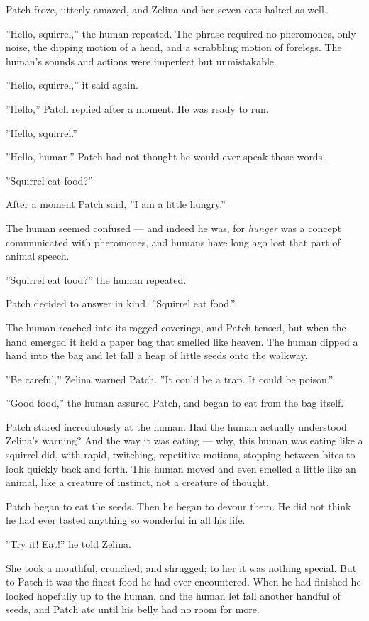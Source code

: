 \documentclass[12pt]{book}
\begin{document}
Patch froze, utterly amazed, and Zelina and her seven cats halted as well.

''Hello, squirrel,'' the human repeated. The phrase required no pheromones, only noise, the dipping motion of a head, and a scrabbling motion of forelegs. The human's sounds and actions were imperfect but unmistakable.

''Hello, squirrel,'' it said again.

''Hello,'' Patch replied after a moment. He was ready to run.

''Hello, squirrel.''

''Hello, human.'' Patch had not thought he would ever speak those words.

''Squirrel eat food?''

After a moment Patch said, ''I am a little hungry.''

The human seemed confused ---
and indeed he was, for {\it hunger} was a concept communicated with pheromones, and humans have long ago lost that part of animal speech.

''Squirrel eat food?'' the human repeated.

Patch decided to answer in kind. ''Squirrel eat food.''

The human reached into its ragged coverings, and Patch tensed, but when the hand emerged it held a paper bag that smelled like heaven. The human dipped a hand into the bag and let fall a heap of little seeds onto the walkway.

''Be careful,'' Zelina warned Patch. ''It could be a trap. It could be poison.''

''Good food,'' the human assured Patch, and began to eat from the bag itself.

Patch stared incredulously at the human. Had the human actually understood Zelina's warning? And the way it was eating ---
why, this human was eating like a squirrel did, with rapid, twitching, repetitive motions, stopping between bites to look quickly back and forth. This human moved and even smelled a little like an animal, like a creature of instinct, not a creature of thought.

Patch began to eat the seeds. Then he began to devour them. He did not think he had ever tasted anything so wonderful in all his life.

''Try it! Eat!'' he told Zelina.

She took a mouthful, crunched, and shrugged; to her it was nothing special. But to Patch it was the finest food he had ever encountered. When he had finished he looked hopefully up to the human, and the human let fall another handful of seeds, and Patch ate until his belly had no room for more.
\end{document}
